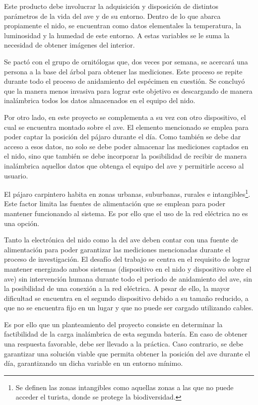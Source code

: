 Este producto debe involucrar la adquisición y disposición de distintos parámetros de la vida del ave y de su entorno. Dentro de lo que abarca propiamente el nido, se encuentran como datos elementales la temperatura, la luminosidad y la humedad de este entorno. A estas variables se le suma la necesidad de obtener imágenes del interior.

Se pactó con el grupo de ornitólogas que, dos veces por semana, se acercará una persona a la base del árbol para obtener las mediciones. Este proceso se repite durante todo el proceso de anidamiento del espécimen en cuestión. Se concluyó que la manera menos invasiva para lograr este objetivo es descargando de manera inalámbrica todos los datos almacenados en el equipo del nido. 

Por otro lado, en este proyecto se complementa a su vez con otro dispositivo, el cual se encuentra montado sobre el ave. El elemento mencionado se emplea para poder captar la posición del pájaro durante el día. Como también se debe dar acceso a esos datos, no solo se debe poder almacenar las mediciones captados en el nido, sino que también se debe incorporar la posibilidad de recibir de manera inalámbrica aquellos datos que obtenga el equipo del ave y permitirle acceso al usuario. 

El pájaro carpintero habita en zonas urbanas, suburbanas, rurales e intangibles\footnote{Se definen las zonas intangibles como aquellas zonas a las que no puede acceder el turista, donde se protege la biodiversidad.}. Este factor limita las fuentes de alimentación que se emplean para poder mantener funcionando al sistema. Es por ello que el uso de la red eléctrica no es una opción.

Tanto la electrónica del nido como la del ave deben contar con una fuente de alimentación para poder garantizar las mediciones mencionadas durante el proceso de investigación. El desafío del trabajo se centra en el requisito de lograr mantener energizado ambos sistemas (dispositivo en el nido y dispositivo sobre el ave) sin intervención humana durante todo el periodo de anidamiento del ave, sin la posibilidad de una conexión a la red eléctrica. A pesar de ello, la mayor dificultad se encuentra en el segundo dispositivo debido a su tamaño reducido, a que no se encuentra fijo en un lugar y que no puede ser cargado utilizando cables.

Es por ello que un planteamiento del proyecto consiste en determinar la factibilidad de la carga inalámbrica de esta segunda batería. En caso de obtener una respuesta favorable, debe ser llevado a la práctica. Caso contrario, se debe garantizar una solución viable que permita obtener la posición del ave durante el día, garantizando un dicha variable en un entorno mínimo.


